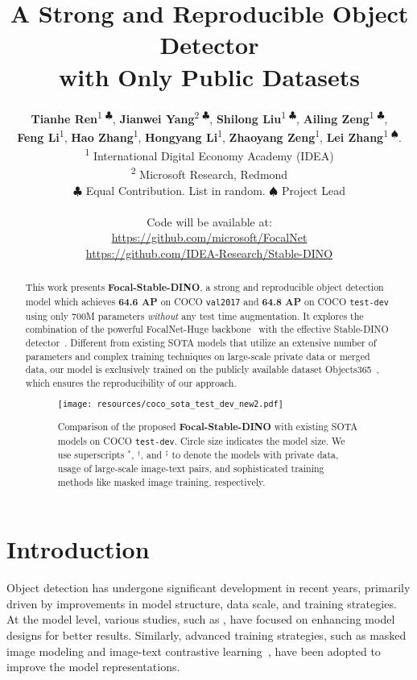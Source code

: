 \documentclass{article}
\title{A Strong and Reproducible Object Detector \\ with Only Public Datasets}
\author{\textbf{Tianhe Ren}\textsuperscript{\rm 1 $\clubsuit$},\; \textbf{Jianwei Yang}\textsuperscript{\rm 2 $\clubsuit$},\; \textbf{Shilong Liu}\textsuperscript{\rm 1 $\clubsuit$},\; \textbf{Ailing Zeng}\textsuperscript{\rm 1 $\clubsuit$}, \\
  \textbf{Feng Li}\textsuperscript{\rm 1},\; \textbf{Hao Zhang}\textsuperscript{\rm 1},\; \textbf{Hongyang Li}\textsuperscript{\rm 1},\; \textbf{Zhaoyang Zeng}\textsuperscript{\rm 1},\; \textbf{Lei Zhang}\textsuperscript{\rm 1 $\spadesuit$}.
  \vspace{0.2cm} \\
    \textsuperscript{\rm 1} International Digital Economy Academy (IDEA)\\
    \textsuperscript{\rm 2} Microsoft Research, Redmond  \\
    $\clubsuit$ Equal Contribution. List in random. $\spadesuit$ Project Lead \\\\
    Code will be available at: \\
    \url{https://github.com/microsoft/FocalNet} \\
    \url{https://github.com/IDEA-Research/Stable-DINO}
}
\begin{document}
\maketitle








\begin{abstract}


This work presents \textbf{Focal-Stable-DINO}, a strong and reproducible object detection model which achieves \textbf{64.6 AP} on COCO \texttt{val2017} and \textbf{64.8 AP} on COCO \texttt{test-dev} using only 700M parameters \emph{without} any test time augmentation. It explores the combination of the powerful FocalNet-Huge backbone~\cite{yang2022focal} with the effective Stable-DINO detector~\cite{liu2023detection}. Different from existing SOTA models that utilize an extensive number of parameters and complex training techniques on large-scale private data or merged data, our model is exclusively trained on the publicly available dataset Objects365~\cite{shao2019objects365}, which ensures the reproducibility of our approach. 










  \begin{figure}[h]
    \centering
\texttt{[image: resources/coco\_sota\_test\_dev\_new2.pdf]}
    \vspace{-0.2cm}
    \caption{Comparison of the proposed \textbf{Focal-Stable-DINO} with existing SOTA models on COCO \texttt{test-dev}. Circle size indicates the model size. We use superscripts $^{*}$, $^{\dag}$, and $^{\ddag}$ to denote the models with private data, usage of large-scale image-text pairs, 
    and sophisticated training methods like masked image training, respectively.
}
    \label{fig:coco_sota_testdev}
\end{figure} 
\end{abstract} 
\section{Introduction}
Object detection has undergone significant development in recent years, primarily driven by improvements in model structure, data scale, and training strategies. At the model level, various studies, such as \cite{gao2021fast, ren2015faster, liu2022dabdetr, li2022dn, zhang2022dino, stabledino, hu2023yoso}, have focused on enhancing model designs for better results. Similarly, advanced training strategies, such as masked image modeling \cite{mae, chen2022group} and image-text contrastive learning~\cite{yuan2021florence, yang2022unified, fang2022eva}, have been adopted to improve the model representations.
\end{document}
